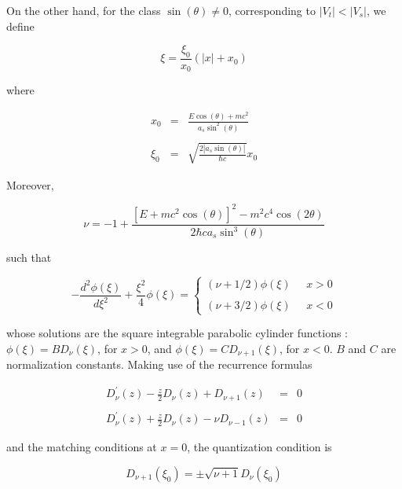 \documentclass[a4paper,12pt,titlepage]{article}
\begin{document}
On the other hand, for the class $\sin (\theta )\neq 0$, corresponding to $%
|V_{t}|<|V_{s}|$, we define

\[
\xi =\frac{\xi _{0}}{x_{0}}\left( |x|+x_{0}\right)
\]

\noindent where

\begin{eqnarray}
x_{0} &=&\frac{E\cos \left( \theta \right) +mc^{2}}{a_{s}\sin ^{2}(\theta )}
\nonumber \\
&&  \label{eq20} \\
\xi _{0} &=&\sqrt{\frac{2|a_{s}\sin (\theta )|}{\hbar c}}x_{0}  \nonumber
\end{eqnarray}

\noindent Moreover,

\begin{equation}
\nu =-1+\frac{\left[ E+mc^{2}\cos \left( \theta \right) \right]
^{2}-m^{2}c^{4}\cos \left( 2\theta \right) }{2\hbar ca_{s}\sin ^{3}(\theta )}
\label{eq21}
\end{equation}

\noindent such that

\begin{equation}
-\frac{d^{2}\phi (\xi )}{d\xi ^{2}}+\frac{\xi ^{2}}{4}\phi (\xi )=\left\{
\begin{array}{c}
\left( \nu +1/2\right) \phi (\xi )\;\;\;\;\;x>0 \\
\\
\left( \nu +3/2\right) \phi (\xi )\;\;\;\;\;x<0
\end{array}
\right.  \label{eq21a}
\end{equation}

\noindent whose solutions are the square integrable parabolic cylinder
functions \cite{abr}: $\phi (\xi )=BD_{\nu }(\xi )$, for $x>0$, and $\phi
(\xi )=CD_{\nu +1}(\xi )$, for $x<0$. $B$ and $C$ are normalization
constants. Making use of the recurrence formulas

\begin{eqnarray}
D_{\nu }^{\prime }(z)-\frac{z}{2}D_{\nu }(z)+D_{\nu +1}(z) &=&0  \nonumber \\
&&  \label{eq22} \\
D_{\nu }^{\prime }(z)+\frac{z}{2}D_{\nu }(z)-\nu D_{\nu -1}(z) &=&0
\nonumber
\end{eqnarray}

\noindent and the matching conditions at $x=0$, the quantization condition is

\begin{equation}
D_{\nu +1}\left( \xi _{0}\right) =\pm \sqrt{\nu +1}D_{\nu }\left( \xi
_{0}\right)  \label{eq23}
\end{equation}
\end{document}
